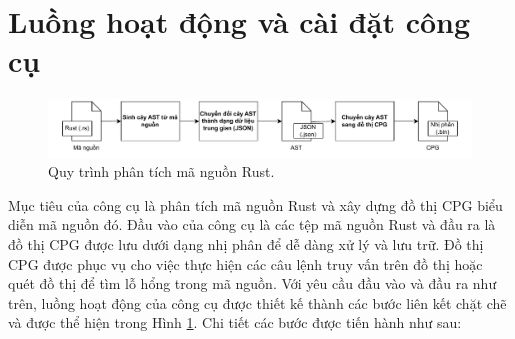 \section{Luồng hoạt động và cài đặt công cụ}

\begin{figure}[H]
	\includegraphics[width=1\columnwidth]{figures/c3/c3_flow_2.drawio.pdf}
	\centering
	\caption{Quy trình phân tích mã nguồn Rust.}
	\label{img:c3_flow_2}
\end{figure}




Mục tiêu của công cụ là phân tích mã nguồn Rust và xây dựng đồ thị CPG biểu diễn mã nguồn đó.
Đầu vào của công cụ là các tệp mã nguồn Rust và đầu ra là đồ thị CPG được lưu dưới dạng nhị phân để dễ dàng xử lý và lưu trữ.
Đồ thị CPG được phục vụ cho việc thực hiện các câu lệnh truy vấn trên đồ thị hoặc quét đồ thị để tìm lỗ hổng trong mã nguồn.
Với yêu cầu đầu vào và đầu ra như trên, luồng hoạt động của công cụ được thiết kế thành các bước liên kết chặt chẽ và được thể hiện trong Hình \ref{img:c3_flow_2}.
Chi tiết các bước được tiến hành như sau:

